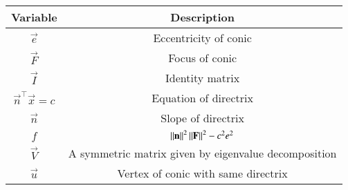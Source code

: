 \begin{tabular}[12pt]{ |c| c|}
    \hline
    \textbf{Variable} & \textbf{Description}\\ 
    \hline
	$\vec{e}$ & Eccentricity of conic\\
	\hline
	$\vec{F}$ & Focus of conic\\
	\hline
	$\vec{I}$ & Identity matrix\\
	\hline
	$\vec{n}^{\top}\vec{x}=c$ & Equation of directrix\\
	\hline
	$\vec{n}$ & Slope of directrix\\
	\hline
	$f$ & $\left\lVert\mathbf{n}\right\rVert^2\left\lVert\mathbf{F}\right\rVert^2-c^2e^2$\\
	\hline
	$\vec{V}$ & A symmetric matrix given by eigenvalue decomposition\\
	\hline
	$\vec{u}$ & Vertex of conic with same directrix\\
	\hline
\end{tabular}
